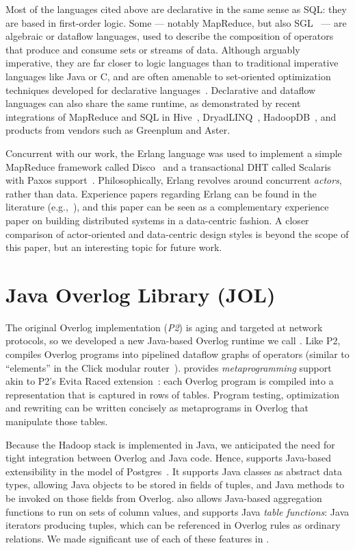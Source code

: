 Most of the languages cited above are declarative in the same sense as SQL: they are based in first-order logic.
Some --- notably MapReduce, but also SGL~\cite{cornellgames} --- are
algebraic or dataflow languages, used to describe the
composition of operators that produce and consume sets
or streams of data.  Although arguably imperative, they are far closer
to logic languages than to traditional imperative languages like Java
or C, and are often amenable to set-oriented optimization techniques developed for declarative languages~\cite{cornellgames}.
Declarative and dataflow languages can also share the same runtime, as
demonstrated by recent integrations of MapReduce and SQL
in Hive~\cite{hive}, DryadLINQ~\cite{DryadLINQ},
HadoopDB~\cite{hadoopdb}, and products from vendors such as Greenplum and Aster.

Concurrent with our work, the Erlang language was used to implement a simple MapReduce framework called Disco~\cite{disco} and a transactional DHT called Scalaris with Paxos support~\cite{scalaris}.
Philosophically, Erlang revolves around concurrent {\em actors}, rather than
data.  Experience papers regarding Erlang can be found in the literature (e.g.,~\cite{armistice}), and this paper can be seen as a complementary experience paper on building distributed systems in a data-centric fashion.  A closer comparison of actor-oriented and data-centric design styles is beyond the scope of this paper, but an interesting topic for future work.


\section{Java Overlog Library (JOL)}
\label{ch:boom:sec:jol}

The original Overlog implementation (\emph{P2}) is aging and targeted at network
protocols, so we developed a new Java-based Overlog runtime we call \emph{\JOL.}
Like P2, \JOL compiles Overlog programs into pipelined dataflow graphs of
operators (similar to ``elements'' in the Click modular router~\cite{click}).
\JOL provides \emph{metaprogramming} support akin to P2's Evita Raced
extension~\cite{evitaraced}: each Overlog program is compiled into a
representation that is captured in rows of tables.  Program testing,
optimization and rewriting can be written concisely as metaprograms in Overlog
that manipulate those tables.

Because the Hadoop stack is implemented in Java, we anticipated the need for
tight integration between Overlog and Java code. Hence, \JOL supports Java-based
extensibility in the model of Postgres~\cite{postgres}.  It supports Java
classes as abstract data types, allowing Java objects to be stored in fields of
tuples, and Java methods to be invoked on those fields from Overlog.  \JOL also
allows Java-based aggregation functions to run on sets of column values, and
supports Java \emph{table functions}: Java iterators producing tuples, which can
be referenced in Overlog rules as ordinary relations. We made significant use of
each of these features in \BOOMA.

